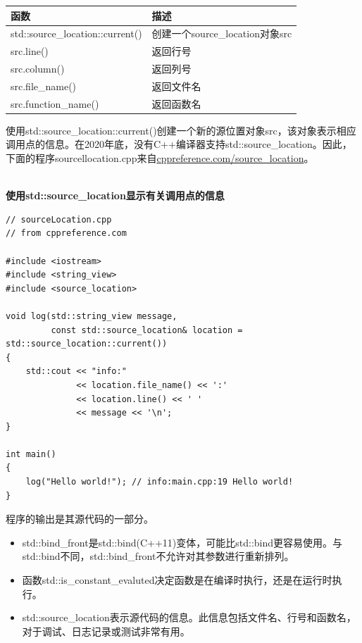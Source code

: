 \begin{table}[H]
\centering
\begin{tabular}{ll}
\textbf{函数}                & \textbf{描述}                      \\ \hline
std::source\_location::current() & 创建一个source\_location对象src \\
src.line()                       & 返回行号                   \\
src.column()                     & 返回列号                 \\
src.file\_name()                 & 返回文件名                     \\
src.function\_name()             & 返回函数名                
\end{tabular}
\end{table}

使用std::source\_location::current()创建一个新的源位置对象src，该对象表示相应调用点的信息。在2020年底，没有C++编译器支持std::source\_location。因此，下面的程序sourcellocation.cpp来自\href{https://en.cppreference.com/w/cpp/utility/source_location}{cppreference.com/source\_location}。

\hspace*{\fill} \\ %
\noindent
\textbf{使用std::source\_location显示有关调用点的信息}
\begin{lstlisting}[style=styleCXX]
// sourceLocation.cpp
// from cppreference.com

#include <iostream>
#include <string_view>
#include <source_location>

void log(std::string_view message,
		 const std::source_location& location = std::source_location::current())
{
	std::cout << "info:"
			  << location.file_name() << ':'
			  << location.line() << ' '
			  << message << '\n';
}

int main()
{
	log("Hello world!"); // info:main.cpp:19 Hello world!
}
\end{lstlisting}

程序的输出是其源代码的一部分。

\begin{tcolorbox}[breakable,enhanced jigsaw,colback=mygreen!5!white,colframe=mygreen!75!black,title={总结}]

\begin{itemize}
\item 
std::bind\_front是std::bind(C++11)变体，可能比std::bind更容易使用。与std::bind不同，std::bind\_front不允许对其参数进行重新排列。

\item 
函数std::is\_constant\_evaluted决定函数是在编译时执行，还是在运行时执行。

\item 
std::source\_location表示源代码的信息。此信息包括文件名、行号和函数名，对于调试、日志记录或测试非常有用。
\end{itemize}

\end{tcolorbox}








